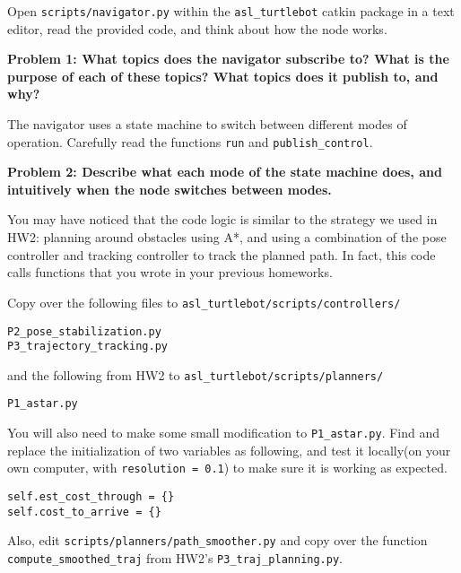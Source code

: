 \documentclass{article}
\begin{document}



Open \texttt{scripts/navigator.py} within the \texttt{asl\_turtlebot} catkin package in a text editor, read the provided code, and think about how the node works.

\textbf{Problem 1: What topics does the navigator subscribe to? What is the purpose of each of these topics? What topics does it publish to, and why?}

The navigator uses a state machine to switch between different modes of operation. Carefully read the functions \texttt{run} and \texttt{publish\_control}.

\textbf{Problem 2: Describe what each mode of the state machine does, and intuitively when the node switches between modes.}

You may have noticed that the code logic is similar to the strategy we used in HW2: planning around obstacles using A*, and using a combination of the pose controller and tracking controller to track the planned path. In fact, this code calls functions that you wrote in your previous homeworks. 

Copy over the following files to \texttt{asl\_turtlebot/scripts/controllers/}

\begin{lstlisting}
P2_pose_stabilization.py
P3_trajectory_tracking.py
\end{lstlisting}

and the following from HW2 to \texttt{asl\_turtlebot/scripts/planners/}

\begin{lstlisting}
P1_astar.py
\end{lstlisting}

You will also need to make some small modification to {\tt P1\_astar.py}. Find and replace the initialization of two variables as following, and test it locally(on your own computer, with \texttt{resolution = 0.1}) to make sure it is working as expected.

\begin{lstlisting}
self.est_cost_through = {}
self.cost_to_arrive = {}
\end{lstlisting}

Also, edit \texttt{scripts/planners/path\_smoother.py} and copy over the function \texttt{compute\_smoothed\_traj} from HW2's \texttt{P3\_traj\_planning.py}.
\end{document}
